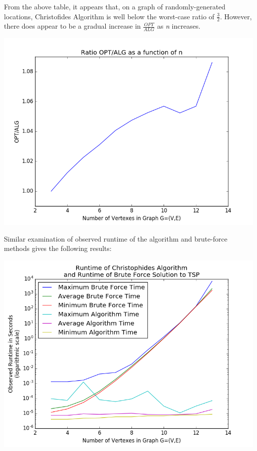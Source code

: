 \documentclass[12pt, oneside]{article}   	%
\begin{document}
\indent\indent From the above table, it appears that, on a graph of randomly-generated locations, Christofides Algorithm is well below the worst-case ratio of $\frac{3}{2}$.  However, there does appear to be a gradual increase in $\frac{OPT}{ALG}$ as \textit{n} increases.\\
\begin{center}
\includegraphics[scale=0.5]{costRatio.png}
\end{center}
\indent Similar examination of observed runtime of the algorithm and brute-force methods gives the following results:\\
\begin{center}
\includegraphics[scale=0.6]{time}
\end{center}
\end{document}
